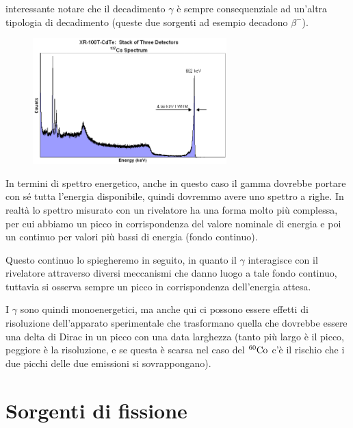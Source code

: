 \E interessante notare che il decadimento $\gamma$ è sempre consequenziale ad un'altra tipologia di decadimento (queste due sorgenti ad esempio decadono $\beta^-$).

\vspace{-0.2cm}

\begin{minipage}{0.495\textwidth}
    \begin{figure}[H]
        \includegraphics[width=7.5cm]{immagini/spettro_gamma.png}
    \end{figure}
\end{minipage}
\begin{minipage}{0.5\textwidth}
    \vspace{0.8cm}In termini di spettro energetico, anche in questo caso il gamma dovrebbe portare con sé tutta l'energia disponibile, quindi dovremmo avere uno spettro a righe. In realtà lo spettro misurato con un rivelatore ha una forma molto più complessa, per cui abbiamo un picco in corrispondenza del valore nominale di energia e poi un continuo per valori più bassi di energia (fondo continuo).
\end{minipage}

\vspace{0.2cm}Questo continuo lo spiegheremo in seguito, in quanto il $\gamma$ interagisce con il rivelatore attraverso diversi meccanismi che danno luogo a tale fondo continuo, tuttavia si osserva sempre un picco in corrispondenza dell'energia attesa.

I $\gamma$ sono quindi monoenergetici, ma anche qui ci possono essere effetti di risoluzione dell'apparato sperimentale che trasformano quella che dovrebbe essere una delta di Dirac in un picco con una data larghezza (tanto più largo è il picco, peggiore è la risoluzione, e se questa è scarsa nel caso del $\rm ^{60} Co$ c'è il rischio che i due picchi delle due emissioni si sovrappongano).

\section{Sorgenti di fissione}

